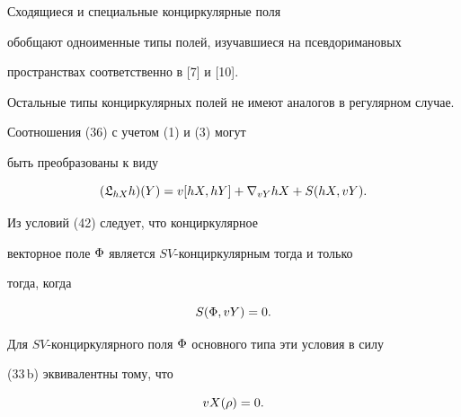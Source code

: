 \begin{note}


Сходящиеся и специальные конциркулярные поля


обобщают одноименные типы полей, изучавшиеся на псевдоримановых


пространствах соответственно в [7] и [10].


Остальные типы конциркулярных полей не имеют аналогов в регулярном случае.


\end{note}





\begin{note}


Соотношения (36) с учетом (1) и (3) могут


быть преобразованы к виду


\begin{equation}


( \frak {L}_{hX}h)(Y)=v[hX,hY]+\nb_{vY}hX+S(hX,vY).


\end{equation}


Из условий (42) следует, что конциркулярное


векторное поле $\Phi$ является $SV$-конциркулярным тогда и только


тогда, когда


\begin{equation}


S(\F,vY)=0.


\end{equation}


Для $SV$-конциркулярного поля $\Phi$ основного типа эти условия в силу


(33\,b) эквивалентны тому, что


\begin{equation}


vX(\ro)=0.


\end{equation}


\end{note}





